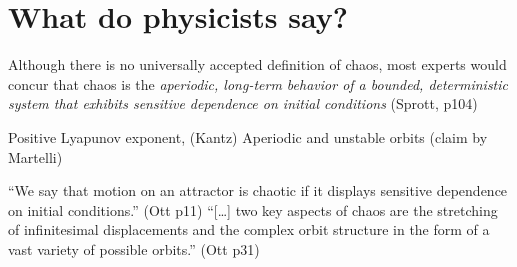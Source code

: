 \documentclass[11pt]{article}
\begin{document}
\section{What do physicists say?}
Although there is no universally accepted definition of chaos,
most experts would concur that chaos is the {\it aperiodic,
  long-term behavior of a bounded, deterministic system
that exhibits sensitive dependence on initial conditions} (Sprott, p104)

Positive Lyapunov exponent, (Kantz)
Aperiodic and unstable orbits (claim by Martelli)

``We say that motion on an attractor is chaotic if
it displays sensitive dependence on initial conditions.'' (Ott p11)
``[\ldots] two key aspects of chaos are the stretching of infinitesimal displacements
and the complex orbit structure in the form of a vast variety of possible orbits.'' (Ott p31)
\end{document}
